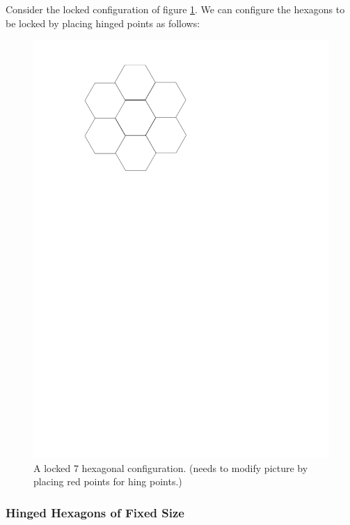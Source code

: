Consider the locked configuration of figure \ref{figure:7hexLocked}.  We can
 configure the hexagons to be locked by placing hinged points as follows:
\begin{figure}[!ht]
\begin{center}
\includegraphics[scale=.33]{graphics/7hexLocked.pdf}
\caption{A locked 7 hexagonal configuration.  (needs to modify picture by
placing red points for hing points.)}
\label{figure:7hexLocked}
\end{center} 
\end{figure}

\subsubsection{Hinged Hexagons of Fixed Size}

